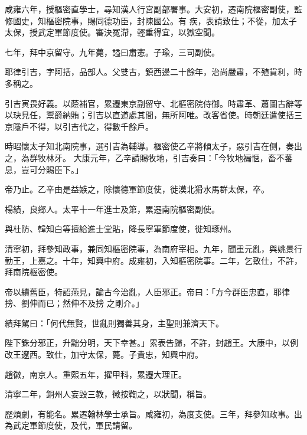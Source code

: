 \begin{pinyinscope}
 咸雍六年，授樞密直學士，尋知漢人行宮副部署事。大安初，遷南院樞密副使，監修國史，知樞密院事，賜同德功臣，封陳國公。有
 疾，表請致仕；不從，加太子太保，授武定軍節度使。審決冤滯，輕重得宜，以獄空聞。



 七年，拜中京留守。九年薨，謚曰肅憲。子瑜，三司副使。



 耶律引吉，字阿括，品部人。父雙古，鎮西邊二十餘年，治尚嚴肅，不殖貨利，時多稱之。



 引吉寅畏好義。以蔭補官，累遷東京副留守、北樞密院侍御。時肅革、蕭圖古辭等以玦見任，鬻爵納賄；引吉以直道處其間，無所阿唯。改客省使。時朝廷遣使括三京隱戶不得，以引吉代之，得數千餘戶。



 時昭懷太子知北南院事，選引吉為輔導。樞密使乙辛將傾太子，惡引吉在側，奏出之，為群牧林牙。
 大康元年，乙辛請賜牧地，引吉奏曰：「今牧地褊愜，畜不蕃息，豈可分賜臣下。」



 帝乃止。乙辛由是益嫉之，除懷德軍節度使，徙漠北猾水馬群太保，卒。



 楊績，良鄉人。太平十一年進士及第，累遷南院樞密副使。



 與杜防、韓知白等擅給進士堂貼，降長寧軍節度使，徙知琢州。



 清寧初，拜參知政事，兼同知樞密院事，為南府宰相。九年，聞重元亂，與姚景行勤王，上嘉之。十年，知興中府。成雍初，入知樞密院事。二年，乞致仕，不許，拜南院樞密使。



 帝以績舊臣，特詔燕見，論古今治亂，人臣邪正。帝曰：「方今群臣忠直，耶律搒、劉伸而已；然伸不及搒
 之剛介。」



 績拜駕曰：「何代無賢，世亂則獨善其身，主聖則兼濟天下。



 陛下銖分邪正，升黜分明，天下幸甚。」累表告歸，不許，封趙王。大康中，以例改王遼西。致仕，加守太保，薨。子貴忠，知興中府。



 趙徽，南京人。重熙五年，擢甲科，累遷大理正。



 清寧二年，銅州人妄毀三教，徽按鞫之，以狀聞，稱旨。



 歷煩劇，有能名。累遷翰林學士承旨。咸雍初，為度支使。三年，拜參知政事。出為武定軍節度使，及代，軍民請留。




\end{pinyinscope}
